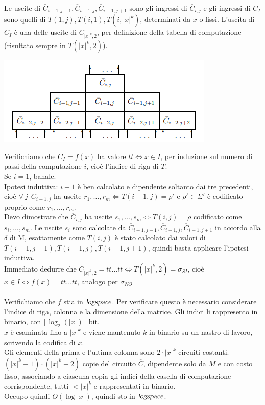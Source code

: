 \documentclass[10pt]{book}
\begin{document}
Le uscite di $\overline{C}_{i-1,j-1}, \overline{C}_{i-1,j}, \overline{C}_{i-1,j+1}$ sono gli ingressi di $\overline{C}_{i,j}$ e gli ingressi di $C_I$ sono quelli di $T(1,j),T(i,1),T(i,|x|^k)$, determinati da $x$ o fissi. L'uscita di $C_I$ è una delle uscite di $\overline{C}_{|x|^k, 2}$, per definizione della tabella di computazione (risultato sempre in $T(|x|^k, 2)$).
\begin{center}
	\includegraphics[scale=0.75]{5.png}
\end{center}
Verifichiamo che $C_I = f(x)$ ha valore $tt \Leftrightarrow x\in I$, per induzione sul numero di passi della computazione $i$, cioè l'indice di riga di $T$.\\
Se $i = 1$, banale.\\
Ipotesi induttiva: $i-1$ è ben calcolato e dipendente soltanto dai tre precedenti, cioè $\forall\:j\:\:\overline{C}_{i-1,j}$ ha uscite $r_1,\ldots,r_m \Leftrightarrow T(i-1,j) = \rho'$ e $\rho'\in\Sigma'$ è codificato proprio come $r_1,\ldots,r_m$.\\
Devo dimostrare che $\overline{C}_{i,j}$ ha uscite $s_1,\ldots,s_m \Leftrightarrow T(i,j)=\rho$ codificato come $s_i,\ldots,s_m$. Le uscite $s_i$ sono calcolate da $\overline{C}_{i-1,j-1}, \overline{C}_{i-1,j}, \overline{C}_{i-1,j+1}$ in accordo alla $\delta$ di M, esattamente come $T(i,j)$ è stato calcolato dai valori di\\$T(i-1,j-1),T(i-1,j),T(i-1,j+1)$, quindi basta applicare l'ipotesi induttiva.\\
Immediato dedurre che $\overline{C}_{|x|^k,2}=tt\ldots tt \Leftrightarrow T(|x|^k,2) = \sigma_{SI}$, cioè $x\in I \Leftrightarrow f(x) = tt\ldots tt$, analogo per $\sigma_{NO}$\\\\
Verifichiamo che $f$ stia in $\textsl{logspace}$. Per verificare questo è necessario considerare l'indice di riga, colonna e la dimensione della matrice. Gli indici li rappresento in binario, con $\lceil\log_2(|x|)\rceil$ bit.\\
$x$ è esaminata fino a $|x|^k$ e viene mantenuto $k$ in binario su un nastro di lavoro, scrivendo la codifica di $x$.\\
Gli elementi della prima e l'ultima colonna sono $2\cdot|x|^k$ circuiti costanti.\\
$(|x|^k-1)\cdot(|x|^k-2)$ copie del circuito $\overline{C}$, dipendente solo da $M$ e con costo fisso, associando a ciascuna copia gli indici della casella di computazione corrispondente, tutti $<|x|^k$ e rappresentati in binario.\\
Occupo quindi $O(\log|x|)$, quindi sto in $\textsl{logspace}$.
\pagebreak
\end{document}
